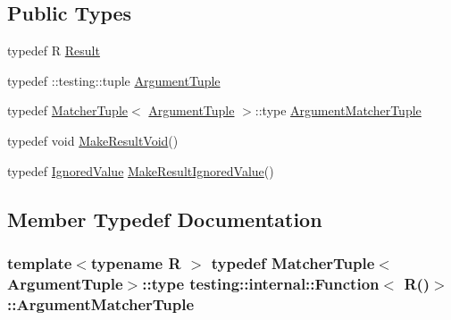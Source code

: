 \subsection*{Public Types}
\begin{DoxyCompactItemize}
\item 
typedef R \hyperlink{structtesting_1_1internal_1_1_function_3_01_r_07_08_4_a5c228a886ef598ac10988f8de5e32ca1}{Result}
\item 
typedef \+::testing\+::tuple \hyperlink{structtesting_1_1internal_1_1_function_3_01_r_07_08_4_ad483c3128c470d8cdb55c3ac1c575c11}{Argument\+Tuple}
\item 
typedef \hyperlink{structtesting_1_1internal_1_1_matcher_tuple}{Matcher\+Tuple}$<$ \hyperlink{structtesting_1_1internal_1_1_function_3_01_r_07_08_4_ad483c3128c470d8cdb55c3ac1c575c11}{Argument\+Tuple} $>$\+::type \hyperlink{structtesting_1_1internal_1_1_function_3_01_r_07_08_4_a9bec5cf8937e8af99dedab2f40129fab}{Argument\+Matcher\+Tuple}
\item 
typedef void \hyperlink{structtesting_1_1internal_1_1_function_3_01_r_07_08_4_a666b5ad3bf155529d3a0f9fe6d5c897b}{Make\+Result\+Void}()
\item 
typedef \hyperlink{classtesting_1_1internal_1_1_ignored_value}{Ignored\+Value} \hyperlink{structtesting_1_1internal_1_1_function_3_01_r_07_08_4_aa459093a5b52ef54e2544b5a6c054383}{Make\+Result\+Ignored\+Value}()
\end{DoxyCompactItemize}


\subsection{Member Typedef Documentation}
\subsubsection[{\texorpdfstring{Argument\+Matcher\+Tuple}{ArgumentMatcherTuple}}]{\setlength{\rightskip}{0pt plus 5cm}template$<$typename R $>$ typedef {\bf Matcher\+Tuple}$<${\bf Argument\+Tuple}$>$\+::type {\bf testing\+::internal\+::\+Function}$<$ R()$>$\+::{\bf Argument\+Matcher\+Tuple}}\hypertarget{structtesting_1_1internal_1_1_function_3_01_r_07_08_4_a9bec5cf8937e8af99dedab2f40129fab}{}\label{structtesting_1_1internal_1_1_function_3_01_r_07_08_4_a9bec5cf8937e8af99dedab2f40129fab}
